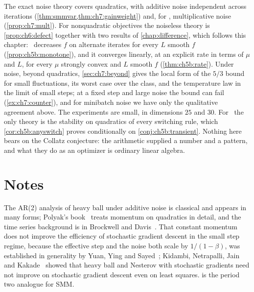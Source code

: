 The exact noise theory covers quadratics, with additive noise independent across iterations (\cref{thm:smmvar,thm:ch7:gainweight}) and, for \smmdet, multiplicative noise (\cref{prop:ch7:mult}).
For nonquadratic objectives the noiseless theory is \cref{prop:ch6:defect} together with two results of \cref{chap:difference}, which follows this chapter: \smmdet\ decreases $f$ on alternate iterates for every $L$ smooth $f$ (\cref{prop:ch5b:monotone}), and it converges linearly, at an explicit rate in terms of $\mu$ and $L$, for every $\mu$ strongly convex and $L$ smooth $f$ (\cref{thm:ch5b:rate}).
Under noise, beyond quadratics, \cref{sec:ch7:beyond} gives the local form of the $5/3$ bound for small fluctuations, its worst case over the class, and the temperature law in the limit of small steps; at a fixed step and large noise the bound can fail (\cref{ex:ch7:counter}), and for minibatch noise we have only the qualitative agreement above.
The experiments are small, in dimensions $25$ and $30$.
For \smmstate\ the only theory is the stability on quadratics of every switching rule, which \cref{cor:ch5b:anyswitch} proves conditionally on \cref{conj:ch5b:transient}.
Nothing here bears on the Collatz conjecture: the arithmetic
supplied a number and a pattern, and what they do as an optimizer is ordinary
linear algebra.

\section*{Notes}

The AR(2) analysis of heavy ball under additive noise is classical and appears
in many forms; Polyak's book~\cite{polyak1987} treats momentum on quadratics in
detail, and the time series background is in Brockwell and
Davis~\cite{brockwell1991}. That constant momentum does not improve the
efficiency of stochastic gradient descent in the small step regime, because the
effective step and the noise both scale by $1/(1-\beta)$, was established in
generality by Yuan, Ying and Sayed~\cite{yuan2016}; Kidambi, Netrapalli, Jain
and Kakade~\cite{kidambi2018} showed that heavy ball and Nesterov with
stochastic gradients need not improve on stochastic gradient descent even on
least squares.  is the period two analogue for SMM.


